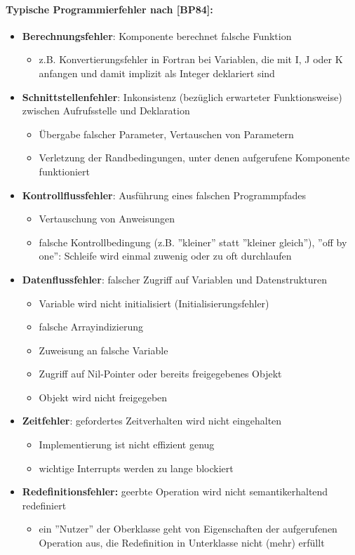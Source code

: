 \paragraph{Typische Programmierfehler nach [BP84]:}

\begin{itemize}
	\item \textbf{Berechnungsfehler}: Komponente berechnet falsche Funktion
	\begin{itemize}
		\item z.B. Konvertierungsfehler in Fortran bei Variablen, die mit I, J oder K anfangen und damit implizit als Integer deklariert sind
	\end{itemize}
	\item \textbf{Schnittstellenfehler}: Inkonsistenz (bezüglich erwarteter Funktionsweise) zwischen Aufrufsstelle und Deklaration
	\begin{itemize}
		\item Übergabe falscher Parameter, Vertauschen von Parametern
		\item Verletzung der Randbedingungen, unter denen aufgerufene Komponente funktioniert
	\end{itemize}
	\item \textbf{Kontrollflussfehler}: Ausführung eines falschen Programmpfades 
	\begin{itemize}
		\item Vertauschung von Anweisungen
		\item falsche Kontrollbedingung (z.B. ''kleiner'' statt ''kleiner gleich''), ''off by one'': Schleife wird einmal zuwenig oder zu oft durchlaufen
	\end{itemize}
	\item \textbf{Datenflussfehler}: falscher Zugriff auf Variablen und Datenstrukturen
	\begin{itemize}
		\item Variable wird nicht initialisiert (Initialisierungsfehler)
		\item falsche Arrayindizierung
		\item Zuweisung an falsche Variable
		\item Zugriff auf Nil-Pointer oder bereits freigegebenes Objekt
		\item Objekt wird nicht freigegeben
	\end{itemize}
	\item \textbf{Zeitfehler}: gefordertes Zeitverhalten wird nicht eingehalten
	\begin{itemize}
		\item Implementierung ist nicht effizient genug
		\item wichtige Interrupts werden zu lange blockiert
	\end{itemize}
	\item \textbf{Redefinitionsfehler:} geerbte Operation wird nicht semantikerhaltend redefiniert
	\begin{itemize}
		\item ein ''Nutzer'' der Oberklasse geht von Eigenschaften der aufgerufenen Operation aus, die Redefinition in Unterklasse nicht (mehr) erfüllt
	\end{itemize}
\end{itemize}

